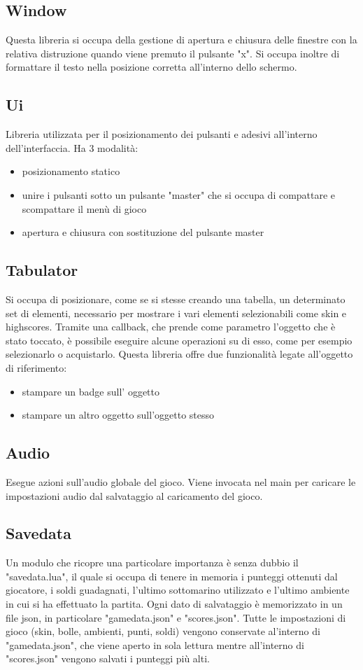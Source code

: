 \documentclass[12pt]{article}
\begin{document}
\subsection{Window}
Questa libreria si occupa della gestione di apertura e chiusura delle finestre con la relativa distruzione quando viene premuto il pulsante "x". Si occupa inoltre di formattare il testo nella posizione corretta all'interno dello schermo.
\subsection{Ui}
Libreria utilizzata per il posizionamento dei pulsanti e adesivi all'interno dell'interfaccia. Ha 3 modalità:
            \begin{itemize}
                \item posizionamento statico 
                \item unire i pulsanti sotto un pulsante "master" che si occupa di compattare e scompattare il menù di gioco
                \item apertura e chiusura con sostituzione del pulsante master
            \end{itemize}
\subsection{Tabulator} 
Si occupa di posizionare, come se si stesse creando una tabella, un determinato set di elementi, necessario per mostrare i vari elementi selezionabili come skin e highscores. Tramite una callback, che prende come parametro l'oggetto che è stato toccato, è possibile eseguire alcune operazioni su di esso, come per esempio selezionarlo o acquistarlo. Questa libreria offre due funzionalità legate all'oggetto di riferimento:
        \begin{itemize}
            \item stampare un badge sull’ oggetto
            \item stampare un altro oggetto sull'oggetto stesso
        \end{itemize}
\subsection{Audio} 
Esegue azioni sull'audio globale del gioco. Viene invocata nel main per caricare le impostazioni audio dal salvataggio al caricamento del gioco.
\subsection{Savedata}
Un modulo che ricopre una particolare importanza è senza dubbio il "savedata.lua", il quale si occupa di tenere in memoria i punteggi ottenuti dal giocatore, i soldi guadagnati, l'ultimo sottomarino utilizzato e l'ultimo ambiente in cui si ha effettuato la partita. Ogni dato di salvataggio è memorizzato in un file json, in particolare "gamedata.json" e "scores.json". 
Tutte le impostazioni di gioco  (skin, bolle, ambienti, punti, soldi) vengono conservate al'interno di "gamedata.json", che viene aperto in sola lettura mentre all'interno di "scores.json" vengono salvati i punteggi più alti. 
\end{document}
